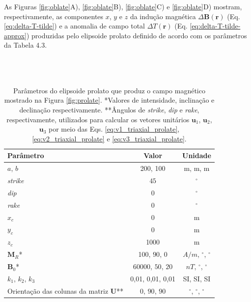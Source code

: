 As Figuras \ref{fig:oblate}A), \ref{fig:oblate}B), \ref{fig:oblate}C) e \ref{fig:oblate}D) mostram, respectivamente, as componentes $x$, $y$ e $z$ da indução magnética $\Delta \mathbf{B}(\mathbf{r})$ (Eq. \ref{eq:delta-T-tilde}) e a
anomalia de campo total $\Delta T (\mathbf{r})$ (Eq. \ref{eq:delta-T-tilde-approx}) produzidas pelo elipsoide prolato definido de acordo com os parâmetros da Tabela 4.3.
\\\\\\\\

\begin{table}[h!]
	\begin{center}
		\begin{tabular}{|l|c|c|}
			\hline
			\textbf{Parâmetro}  & \textbf{Valor}  & \textbf{Unidade} \\
			\hline 
			$a$, $b$   & 200, 100 & m, m, m\\
			\hline
			\textit{strike}   & $45$ & $^{\circ}$\\
			\hline
			\textit{dip}    & $0$ & $^{\circ}$\\
			\hline
			\textit{rake}   & $0$  & $^{\circ}$\\
			\hline
			$x_c$   & 0  & m\\
			\hline          
			$y_c$   & 0  & m\\
			\hline                
			$z_c$   & 1000  & m\\
			\hline
			$\mathbf{M}_{R}$*  & 100, $90$, $0$ & $A/m$, $^{\circ}$, $^{\circ}$\\
			\hline
			$\mathbf{B}_{0}$*    & 60000, $50$, $20$ & $nT$, $^{\circ}$, $^{\circ}$\\
			\hline
			$k_{1}$, $k_{2}$, $k_{3}$   & 0,01, 0,01, 0,01  & SI, SI, SI\\
			\hline
			Orientação das colunas da matriz $\mathbf{U}$**   & $0$, $90$, $90$  & $^{\circ}$, $^{\circ}$, $^{\circ}$\\
			\hline
			
		\end{tabular}
		\caption{Parâmetros do elipsoide prolato que produz o campo magnético mostrado na Figura \ref{fig:prolate}. *Valores de intensidade, inclinação e declinação respectivamente. **Ângulos de \textit{strike}, \textit{dip}  e \textit{rake}, respectivamente, utilizados para calcular os vetores unitários $\mathbf{u}_{1}$, $\mathbf{u}_{2}$, $\mathbf{u}_{3}$ por meio das Eqs. \ref{eq:v1_triaxial_prolate}, \ref{eq:v2_triaxial_prolate} e \ref{eq:v3_triaxial_prolate}.}
	\end{center}
	\label{tab:prolato}
\end{table}

